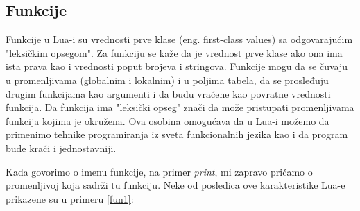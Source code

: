 \documentclass[a4paper]{article}
\begin{document}
\subsection*{Funkcije}
Funkcije u Lua-i su vrednosti prve klase (eng. first-class values) sa odgovarajućim "leksičkim opsegom". Za funkciju se kaže da je vrednost prve klase ako ona ima ista prava kao i vrednosti poput brojeva i stringova. Funkcije mogu da se čuvaju u promenljivama (globalnim i lokalnim) i u poljima tabela, da se prosleđuju drugim funkcijama kao argumenti i da budu vraćene kao povratne vrednosti funkcija. Da funkcija ima "leksički opseg" znači da može pristupati promenljivama funkcija kojima je okružena. Ova osobina omogućava da u Lua-i možemo da primenimo tehnike programiranja iz sveta funkcionalnih jezika kao i da program bude kraći i jednostavniji.

Kada govorimo o imenu funkcije, na primer \textit{print}, mi zapravo pričamo o promenljivoj koja sadrži tu funkciju. Neke od posledica ove karakteristike Lua-e prikazene su u primeru \ref{fun1}:
\end{document}
